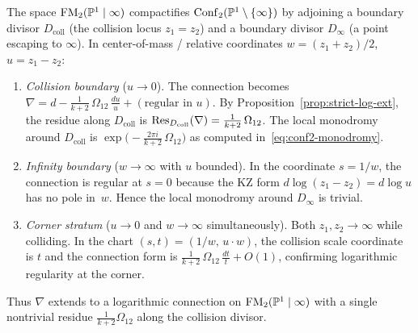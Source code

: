 \begin{computation}
The space $\mathrm{FM}_2(\mathbb P^1\mid\infty)$ compactifies $\mathrm{Conf}_2(\mathbb P^1\setminus\{\infty\})$
by adjoining a boundary divisor $D_{\mathrm{coll}}$ (the collision locus $z_1=z_2$)
and a boundary divisor $D_\infty$ (a point escaping to $\infty$).
In center-of-mass / relative coordinates $w=(z_1+z_2)/2$, $u=z_1-z_2$:
\begin{enumerate}[label=\textup{(\alph*)}]
\item \emph{Collision boundary} ($u\to 0$).
 The connection becomes
 $\nabla = d - \frac{1}{k+2}\,\Omega_{12}\,\frac{du}{u} + (\text{regular in } u)$.
 By Proposition~\ref{prop:strict-log-ext}, the residue along $D_{\mathrm{coll}}$
 is $\mathrm{Res}_{D_{\mathrm{coll}}}(\nabla)=\frac{1}{k+2}\,\Omega_{12}$.
 The local monodromy around $D_{\mathrm{coll}}$ is
 $\exp\!\bigl(-\frac{2\pi i}{k+2}\,\Omega_{12}\bigr)$ as computed in~\eqref{eq:conf2-monodromy}.
\item \emph{Infinity boundary} ($w\to\infty$ with $u$ bounded).
 In the coordinate $s=1/w$, the connection is regular at $s=0$
 because the KZ form $d\log(z_1-z_2)=d\log u$ has no pole in~$w$.
 Hence the local monodromy around $D_\infty$ is trivial.
\item \emph{Corner stratum} ($u\to 0$ and $w\to\infty$ simultaneously).
 Both $z_1,z_2\to\infty$ while colliding.
 In the chart $(s,t)=(1/w,\,u\cdot w)$, the collision scale coordinate
 is $t$ and the connection form is
 $\frac{1}{k+2}\,\Omega_{12}\,\frac{dt}{t}+O(1)$,
 confirming logarithmic regularity at the corner.
\end{enumerate}
Thus $\nabla$ extends to a logarithmic connection on $\mathrm{FM}_2(\mathbb P^1\mid\infty)$
with a single nontrivial residue $\frac{1}{k+2}\Omega_{12}$
along the collision divisor.
\end{computation}

